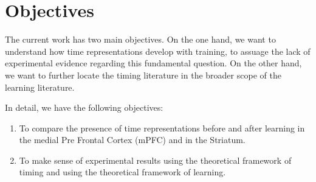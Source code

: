 
\section{Objectives}
    The current work has two main objectives. On the one hand, we want to understand how time representations develop with training, to assuage the lack of experimental evidence regarding this fundamental question. On the other hand, we want to further locate the timing literature in the broader scope of the learning literature.
    
    In detail, we have the following objectives:
    \begin{enumerate}
        \item To compare the presence of time representations before and after learning in the medial Pre Frontal Cortex (mPFC) and in the Striatum.
        \item To make sense of experimental results using the theoretical framework of timing and using the theoretical framework of learning.
    \end{enumerate}


